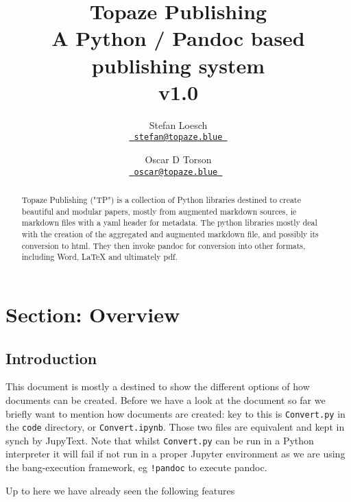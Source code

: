 \documentclass[11pt]{article}
\title{ Topaze Publishing \\ \large A Python / Pandoc based publishing system \\ v1.0}
\author{
   Stefan Loesch \\
  \texttt{\href{mailto:stefan@topaze.blue }{ stefan@topaze.blue }}    
  \and
  Oscar D Torson \\
  \texttt{\href{mailto:oscar@topaze.blue }{ oscar@topaze.blue } }
}
\affil{  \href{  }{  }  }
\begin{document}
\maketitle

\begin{abstract}
   Topaze Publishing ("TP") is a collection of Python libraries destined to create
beautiful and modular papers, mostly from augmented markdown sources, ie markdown 
files with a yaml header for metadata. The python libraries mostly deal with the 
creation of the aggregated and augmented markdown file, and possibly its conversion
to html. They then invoke pandoc for conversion into other formats, including Word,
LaTeX and ultimately pdf.

\end{abstract}

\pagebreak

\tableofcontents

\pagebreak






\pagebreak

\hypertarget{section-overview}{%
\section{Section: Overview}\label{section-overview}}


\pagebreak

\hypertarget{introduction}{%
\subsection{Introduction}\label{introduction}}


This document is mostly a destined to show the different options of how
documents can be created. Before we have a look at the document so far
we briefly want to mention how documents are created: key to this is
\texttt{Convert.py} in the \texttt{code} directory, or
\texttt{Convert.ipynb}. Those two files are equivalent and kept in synch
by JupyText. Note that whilst \texttt{Convert.py} can be run in a Python
interpreter it will fail if not run in a proper Jupyter environment as
we are using the bang-execution framework, eg \texttt{!pandoc} to
execute pandoc.

Up to here we have already seen the following features
\end{document}
